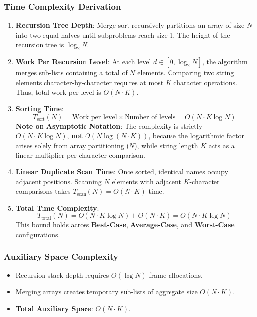 \subsubsection{Time Complexity Derivation}
\begin{enumerate}
    \item \textbf{Recursion Tree Depth}: Merge sort recursively partitions an array of size $N$ into two equal halves until subproblems reach size 1. The height of the recursion tree is $\log_2 N$.
    \item \textbf{Work Per Recursion Level}: At each level $d \in [0, \log_2 N]$, the algorithm merges sub-lists containing a total of $N$ elements. Comparing two string elements character-by-character requires at most $K$ character operations. Thus, total work per level is $O(N \cdot K)$.
    \item \textbf{Sorting Time}:
    \[
    T_{\text{sort}}(N) = \text{Work per level} \times \text{Number of levels} = O(N \cdot K \log N)
    \]
    \textbf{Note on Asymptotic Notation}: The complexity is strictly $O(N \cdot K \log N)$, \textbf{not} $O(N \log(N \cdot K))$, because the logarithmic factor arises solely from array partitioning ($N$), while string length $K$ acts as a linear multiplier per character comparison.
    \item \textbf{Linear Duplicate Scan Time}: Once sorted, identical names occupy adjacent positions. Scanning $N$ elements with adjacent $K$-character comparisons takes $T_{\text{scan}}(N) = O(N \cdot K)$ time.
    \item \textbf{Total Time Complexity}:
    \[
    T_{\text{total}}(N) = O(N \cdot K \log N) + O(N \cdot K) = O(N \cdot K \log N)
    \]
    This bound holds across \textbf{Best-Case}, \textbf{Average-Case}, and \textbf{Worst-Case} configurations.
\end{enumerate}

\subsubsection{Auxiliary Space Complexity}
\begin{itemize}
    \item Recursion stack depth requires $O(\log N)$ frame allocations.
    \item Merging arrays creates temporary sub-lists of aggregate size $O(N \cdot K)$.
    \item \textbf{Total Auxiliary Space}: $O(N \cdot K)$.
\end{itemize}

